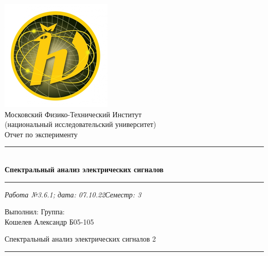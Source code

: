 \documentclass[12pt,a4paper]{scrartcl}
\begin{document}
	\begin{titlepage}
		
		\vspace*{\fill}
		
		\begin{center}
			\includegraphics[scale=0.8]{MIPT.png}
			\\[0.7cm]\Huge Московский Физико-Технический Институт\\(национальный исследовательский университет)
			\\[2cm]\LARGE Отчет по эксперименту
			\\[0.5cm]\noindent\rule{\textwidth}{1pt}
			\\\Huge\textbf{Спектральный анализ электрических сигналов}
			\\[-0.5cm]\noindent\rule{\textwidth}{1pt}
		\end{center}
		
		\begin{flushleft}
			\textit{Работа №3.6.1; дата: 07.10.22}\hfill\textit{Семестр: 3}
		\end{flushleft}
		
		\vspace*{\fill}
		
		\begin{flushleft}
			Выполнил: \hspace{\fill} Группа:
			\\Кошелев Александр \hspace{\fill} Б05-105
		\end{flushleft}
	\end{titlepage}
	
	
	\begin{flushleft}
		\footnotesize{Спектральный анализ электрических сигналов} \hspace{\fill} \footnotesize{2}
		\\[-0.3cm]\noindent\rule{\textwidth}{0.3pt}
	\end{flushleft}
	
\end{document}
